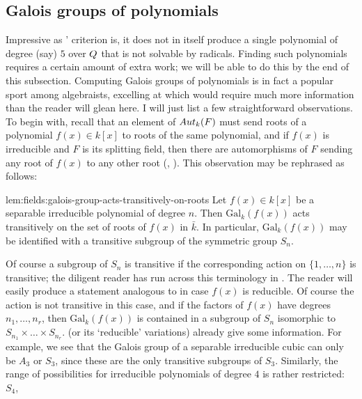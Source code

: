 \subsection{Galois groups of polynomials}
\label{subsec:fields:galois-groups-of-polynomials}
Impressive as ' criterion is, it does not in itself
produce a single polynomial of degree (say) $5$ over $Q$ that is not
solvable by radicals. Finding such polynomials requires a certain
amount of extra work; we will be able to do this by the end of this
subsection.  Computing Galois groups of polynomials is in fact a
popular sport among algebraists, excelling at which would require much
more information than the reader will glean here. I will just list a
few straightforward observations.  To begin with, recall that an
element of $Aut_k(F)$ must send roots of a polynomial $f(x) \in k[x]$
to roots of the same polynomial, and if $f(x)$ is irreducible and $F$
is its splitting field, then there are automorphisms of $F$ sending
any root of $f(x)$ to any other root (,
). This observation may be rephrased as follows:
\begin{lem}{}{lem:fields:galois-group-acts-transitively-on-roots}
  Let $f(x) \in k[x]$ be a separable irreducible polynomial of degree
  $n$. Then $\mathrm{Gal}_k(f(x))$ acts transitively on the set of
  roots of $f(x)$ in $\bar{k}$. In particular, $\mathrm{Gal}_k(f(x))$
  may be identified with a transitive subgroup of the symmetric group
  $S_n$.
\end{lem}
Of course a subgroup of $S_n$ is transitive if the corresponding
action on $\{1, \dots, n\}$ is transitive; the diligent reader has run
across this terminology in
.  The reader will easily
produce a statement analogous to  in case $f(x)$
is reducible. Of course the action is not transitive in this case, and
if the factors of $f(x)$ have degrees $n_1, \dots, n_r$, then
$\mathrm{Gal}_k(f(x))$ is contained in a subgroup of $S_n$ isomorphic
to $S_{n_1} \times \dots \times S_{n_r}$.   (or
its `reducible' variations) already give some information. For
example, we see that the Galois group of a separable irreducible cubic
can only be $A_3$ or $S_3$, since these are the only transitive
subgroups of $S_3$. Similarly, the range of possibilities for
irreducible polynomials of degree $4$ is rather restricted: $S_4$,
